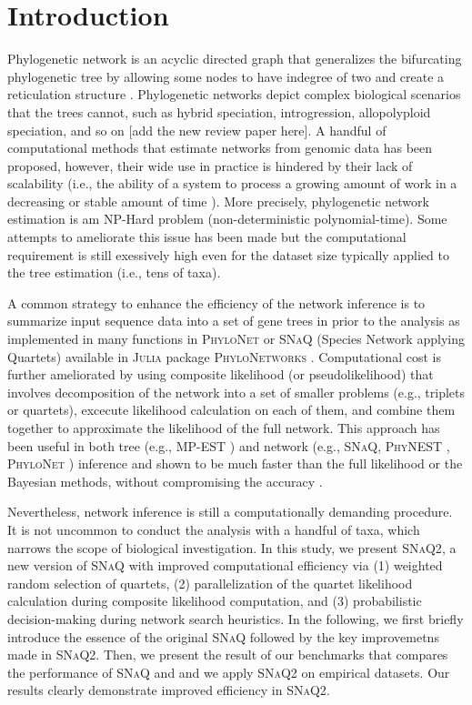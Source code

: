 \documentclass[unnumsec,webpdf,contemporary,large]{oup-authoring-template}%
\theoremstyle{thmstyleone}%
\theoremstyle{thmstyletwo}%
\theoremstyle{thmstylethree}%
\begin{document}
\section{Introduction}\label{sec1}
Phylogenetic network is an acyclic directed graph that generalizes the bifurcating phylogenetic tree by allowing some nodes to have indegree of two and create a reticulation structure \citep{huson2010,kong2022a}. Phylogenetic networks depict complex biological scenarios that the trees cannot, such as hybrid speciation, introgression, allopolyploid speciation, and so on \citep{huson2006}[add the new review paper here]. A handful of computational methods that estimate networks from genomic data has been proposed, however, their wide use in practice is hindered by their lack of scalability (i.e., the ability of a system to process a growing amount of work in a decreasing or stable amount of time \citep{bondi2000}). More precisely, phylogenetic network estimation is am NP-Hard problem (non-deterministic polynomial-time). Some attempts to ameliorate this issue has been made but the computational requirement is still exessively high even for the dataset size typically applied to the tree estimation (i.e., tens of taxa).

A common strategy to enhance the efficiency of the network inference is to summarize input sequence data into a set of gene trees in prior to the analysis as implemented in many functions in \textsc{PhyloNet} \citep{than2008,wen2018a} or \textsc{SNaQ} (Species Network applying Quartets) \citep{solis-lemus2016} available in \textsc{Julia} package \textsc{PhyloNetworks} \citep{solis-lemus2017}. Computational cost is further ameliorated by using composite likelihood (or pseudolikelihood) that involves decomposition of the network into a set of smaller problems (e.g., triplets or quartets), excecute likelihood calculation on each of them, and combine them together to approximate the likelihood of the full network. This approach has been useful in both tree (e.g., \textsc{MP-EST} \citep{liu2010}) and network (e.g., \textsc{SNaQ}, \textsc{PhyNEST} \citep{kong2022c}, \textsc{PhyloNet} \citep{yu2015,zhu2018a}) inference and shown to be much faster than the full likelihood or the Bayesian methods, without compromising the accuracy \citep{hejase2016}.

Nevertheless, network inference is still a computationally demanding procedure. It is not uncommon to conduct the analysis with a handful of taxa, which narrows the scope of biological investigation. In this study, we present \textsc{SNaQ2}, a new version of \textsc{SNaQ} with improved computational efficiency via (1) weighted random selection of quartets, (2) parallelization of the quartet likelihood calculation during composite likelihood computation, and (3) probabilistic decision-making during network search heuristics. In the following, we first briefly introduce the essence of the original \textsc{SNaQ} followed by the key improvemetns made in \textsc{SNaQ2}. Then, we present the result of our benchmarks that compares the performance of \textsc{SNaQ} and  and we apply \textsc{SNaQ2} on empirical datasets. Our results clearly demonstrate improved efficiency in \textsc{SNaQ2}.
\end{document}
